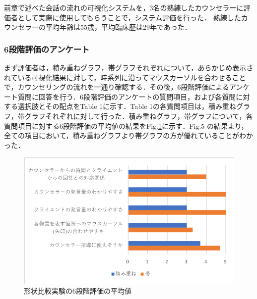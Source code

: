 \documentclass[shuuron]{kuee}
\begin{document}
前章で述べた会話の流れの可視化システムを，3名の熟練したカウンセラーに評価者として実際に使用してもらうことで，システム評価を行った．
熟練したカウンセラーの平均年齢は55歳，平均臨床歴は29年であった．

\subsubsection{6段階評価のアンケート}



まず評価者は，積み重ねグラフ，帯グラフそれぞれについて，あらかじめ表示されている可視化結果に対して，時系列に沿ってマウスカーソルを合わせることで，カウンセリングの流れを一通り確認する．その後，6段階評価によるアンケート質問に回答を行う．6段階評価のアンケートの質問項目，および各質問に対する選択肢とその配点をTable 1に示す．Table 1の各質問項目は，積み重ねグラフ，帯グラフそれぞれに対して行った．積み重ねグラフ，帯グラフについて，各質問項目に対する6段階評価の平均値の結果をFig.\ref{fig:keijouAnketo}に示す．Fig.5 の結果より，全ての項目において，積み重ねグラフより帯グラフの方が優れていることがわかった．

%

\begin{figure}
  \begin{center}
    \includegraphics[width=\linewidth]{keijouAnketo.png}
  \end{center}
  \caption{形状比較実験の6段階評価の平均値}
  \label{fig:keijouAnketo}
\end{figure}
\end{document}
